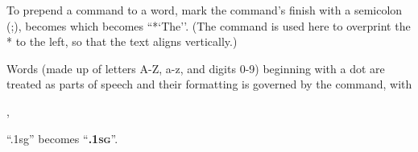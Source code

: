 \documentclass{article}
\begin{document}





 To prepend a command to a word, mark the command's finish with a semicolon (;), \gleg {} becomes  which becomes ``*`The''. (The  command is used here to overprint the * to the left, so that the text aligns vertically.)

\begin{exe}
\ex
{}
\end{exe}




 Words (\glie made up of letters A-Z, a-z, and digits 0-9) beginning with a dot are treated as parts of speech and their formatting is governed by the  command, \gleg with 

, 

``.1sg'' becomes ``{\scshape\bfseries\sffamily .1sg}''.

\mfssetposformat{\scshape\bfseries\sffamily}
\begin{exe}
    \ex 
%

\end{exe}
\end{document}
